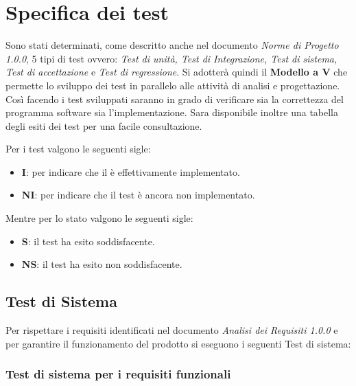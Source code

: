 
\section{Specifica dei test}

Sono stati determinati, come descritto anche nel documento \textit{Norme di Progetto 1.0.0}, 5 tipi di test ovvero: \textit{Test di unità, Test di Integrazione, Test di sistema, Test di accettazione} e \textit{Test di regressione}. Si adotterà quindi il \textbf{Modello a V}\glo{} che permette lo sviluppo dei test in parallelo alle attività di analisi e progettazione. Così facendo i test sviluppati saranno in grado di verificare sia la correttezza del programma software sia l'implementazione. Sara disponibile inoltre una tabella degli esiti dei test per una facile consultazione.

Per i test valgono le seguenti sigle:

    \begin{itemize}
        \item \textbf{I}: per indicare che il è effettivamente implementato.
        \item \textbf{NI}: per indicare che il test è ancora non implementato.
    \end{itemize}
    
Mentre per lo stato valgono le seguenti sigle:

    \begin{itemize}
        \item \textbf{S}: il test ha esito soddisfacente.
        \item \textbf{NS}: il test ha esito non soddisfacente.
    \end{itemize}
    

 
\subsection{Test di Sistema}

    Per rispettare i requisiti identificati nel documento \textit{Analisi dei Requisiti 1.0.0} e per garantire il funzionamento del prodotto si eseguono i seguenti Test di sistema:\\
    
\subsubsection{Test di sistema per i requisiti funzionali}
    \hphantom{}

